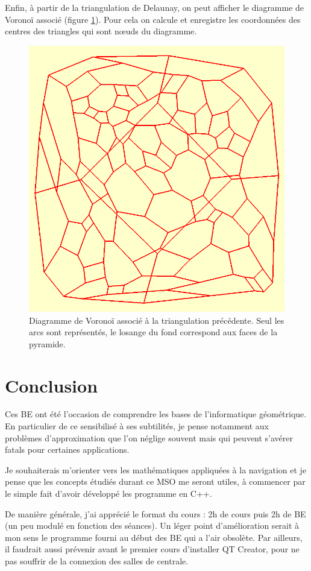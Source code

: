 \documentclass[12pt,a4paper,twoside]{report}
\begin{document}
Enfin, à partir de la triangulation de Delaunay, on peut afficher le diagramme de Voronoï associé (figure \ref{fig:vornoi}). Pour cela on calcule et enregistre les coordonnées des centres des triangles qui sont nœuds du diagramme.

\begin{figure}[H]
	\centering
	\includegraphics[scale=0.5]{voronoi.png}
	\caption{Diagramme de Voronoï associé à la triangulation précédente. Seul les arcs sont représentés, le losange du fond correspond aux faces de la pyramide.}
	\label{fig:vornoi}
\end{figure}

\newpage\section*{Conclusion}

Ces BE ont été l'occasion de comprendre les bases de l'informatique géométrique. En particulier de ce sensibilisé à ses subtilités, je pense notamment aux problèmes d'approximation que l'on néglige souvent mais qui peuvent s'avérer fatals pour certaines applications.

Je souhaiterais m'orienter vers les mathématiques appliquées à la navigation et je pense que les concepts étudiés durant ce MSO me seront utiles, à commencer par le simple fait d'avoir développé les programme en C++.

De manière générale, j'ai apprécié le format du cours : 2h de cours puis 2h de BE (un peu modulé en fonction des séances). Un léger point d'amélioration serait à mon sens le programme fourni au début des BE qui a l'air obsolète.  Par ailleurs, il faudrait aussi prévenir avant le premier cours d'installer QT Creator, pour ne pas souffrir de la connexion des salles de centrale.
\end{document}

